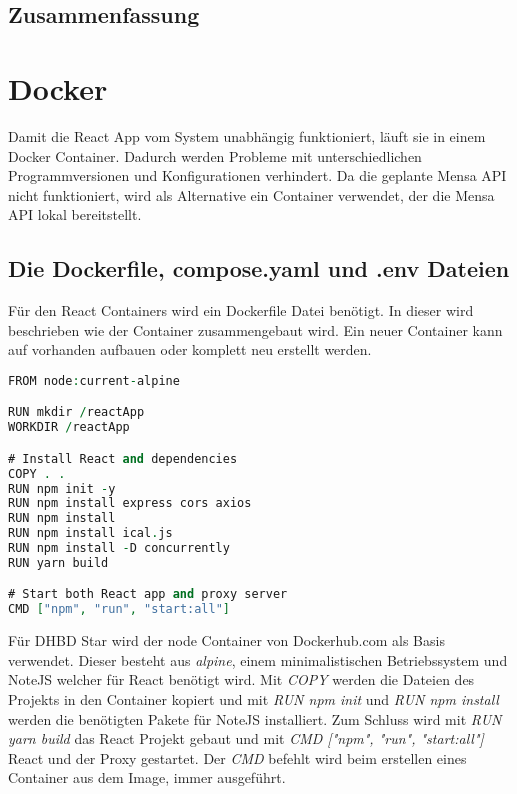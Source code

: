 \subsection{Zusammenfassung}
\section{Docker}

Damit die React App vom System unabhängig funktioniert, läuft sie in einem Docker Container. Dadurch werden Probleme mit unterschiedlichen Programmversionen und Konfigurationen verhindert.
Da die geplante Mensa API nicht funktioniert, wird als Alternative ein Container verwendet, der die Mensa API lokal bereitstellt.

\subsection{Die Dockerfile, compose.yaml und .env Dateien}

Für den React Containers wird ein Dockerfile Datei benötigt. In dieser wird beschrieben wie der Container zusammengebaut wird. Ein neuer Container kann auf vorhanden aufbauen oder komplett neu erstellt werden.

\begin{lstlisting}[language=vhdl,
	frame=single,           % Ein Rahmen um den Code
	framexleftmargin=15pt,  % Rahmen link von den Zahlen
	style=algoBericht,
	label={Dockerfile},
	captionpos=b           % Caption unter den Code setzen
	caption={Dockerfile für DHBW-Star}]
FROM node:current-alpine

RUN mkdir /reactApp
WORKDIR /reactApp

# Install React and dependencies
COPY . .
RUN npm init -y
RUN npm install express cors axios
RUN npm install
RUN npm install ical.js
RUN npm install -D concurrently
RUN yarn build

# Start both React app and proxy server
CMD ["npm", "run", "start:all"]
\end{lstlisting}

Für DHBD Star wird der node Container von Dockerhub.com als Basis verwendet. Dieser besteht aus \emph{alpine}, einem minimalistischen Betriebssystem und NoteJS welcher für React benötigt wird.
Mit \emph{COPY} werden die Dateien des Projekts in den Container kopiert und mit \emph{RUN npm init} und \emph{RUN npm install} werden die benötigten Pakete für NoteJS installiert.
Zum Schluss wird mit \emph{RUN yarn build} das React Projekt gebaut und mit \emph{CMD ["npm", "run", "start:all"]} React und der Proxy gestartet. Der \emph{CMD} befehlt wird beim erstellen eines Container aus dem Image, immer ausgeführt. 

